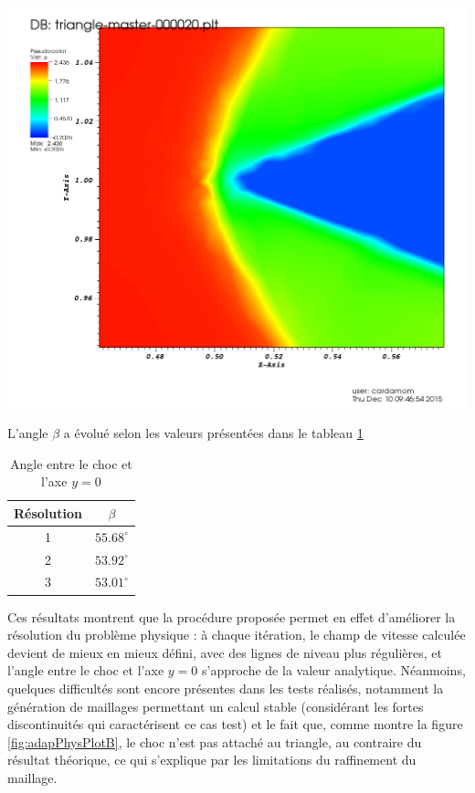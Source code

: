 	\begin{minipage}[t]{1.\linewidth}
		\centering
		\includegraphics[scale=.2]{Bordeaux/figures/AdapPhysique/Plot4bI2B.png}
	\end{minipage}
\endgroup

\indent

\indent L'angle \(\beta\) a évolué selon les valeurs présentées dans le tableau \ref{tab:beta}

\begin{table}[!ht]
	\centering
	\begin{tabular}{c|c}
		Résolution & \(\beta\) \\
		\hline
		1 & \(55.68^\circ\) \\
		2 & \(53.92^\circ\) \\
		3 & \(53.01^\circ\) \\
	\end{tabular}
	\caption{Angle entre le choc et l'axe \(y=0\) \label{tab:beta}}
\end{table}

\indent Ces résultats montrent que la procédure proposée permet en effet d'améliorer la résolution du problème physique : à chaque itération, le champ de vitesse calculée devient de mieux en mieux défini, avec des lignes de niveau plus régulières, et l'angle entre le choc et l'axe \(y=0\) s'approche de la valeur analytique. Néanmoins, quelques difficultés sont encore présentes dans les tests réalisés, notamment la génération de maillages permettant un calcul stable (considérant les fortes discontinuités qui caractérisent ce cas test) et le fait que, comme montre la figure \ref{fig:adapPhysPlotB}, le choc n'est pas attaché au triangle, au contraire du résultat théorique, ce qui s'explique par les limitations du raffinement du maillage.